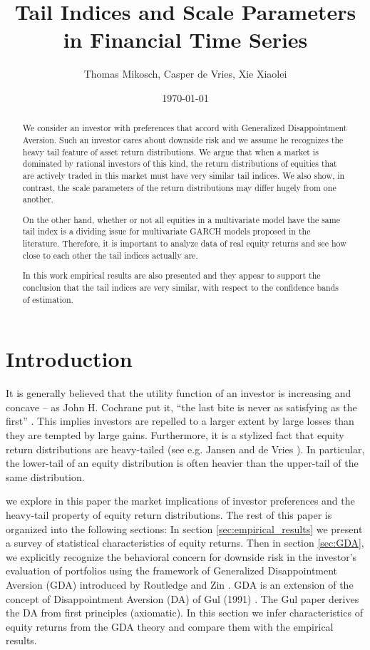 \documentclass{article}
\title{Tail Indices and Scale Parameters in Financial Time Series}
\author{Thomas Mikosch, Casper de Vries, Xie Xiaolei}
\date{\today}
\begin{document}
\maketitle

\begin{abstract}
We consider an investor with preferences that accord with Generalized
Disappointment Aversion. Such an investor cares about downside risk and
we assume he recognizes the heavy tail feature of asset return
distributions. We argue that when a market is dominated by rational
investors of this kind, the return distributions of equities that are
actively traded in this market must have very similar tail indices. We
also show, in contrast, the scale parameters of the return
distributions may differ hugely from one another.

On the other hand, whether or not all equities in a multivariate model
have the same tail index is a dividing issue for multivariate GARCH
models proposed in the literature. Therefore, it is important to analyze
data of real equity returns and see how close to each other the
tail indices actually are.

In this work empirical results are also presented and they appear
to support the conclusion that the tail indices are very similar,
with respect to the confidence bands of estimation.
\end{abstract}

\section{Introduction}
It is generally believed that the utility function of an
investor is increasing and concave -- as John H. Cochrane
put it, ``the last bite is never as satisfying as the first''
\cite{cochrane2009asset}. This implies investors are repelled to a
larger extent by large losses than they are tempted by large gains. 
Furthermore, it is a stylized fact that equity return distributions
are heavy-tailed (see e.g. Jansen and de Vries \cite{jansen1991frequency}).
In particular, the lower-tail of an equity distribution is often heavier
than the upper-tail of the same distribution.

we explore in this paper the market implications of investor
preferences and the heavy-tail property of equity return
distributions. The rest of this paper is organized into the following
sections:
In section \ref{sec:empirical_results} we present a survey of
statistical characteristics of equity returns. Then 
in section \ref{sec:GDA}, we explicitly recognize the behavioral
concern for downside risk in the investor's evaluation of portfolios
using the framework of Generalized Disappointment Aversion (GDA)
introduced by Routledge and Zin \cite{routledge2010generalized}. GDA
is an extension of the concept of Disappointment Aversion (DA) of Gul
(1991) \cite{gul1991theory}. The Gul paper derives the DA from first
principles (axiomatic).
In this section we infer characteristics of equity returns from the
GDA theory and compare them with the empirical results. 
\end{document}
